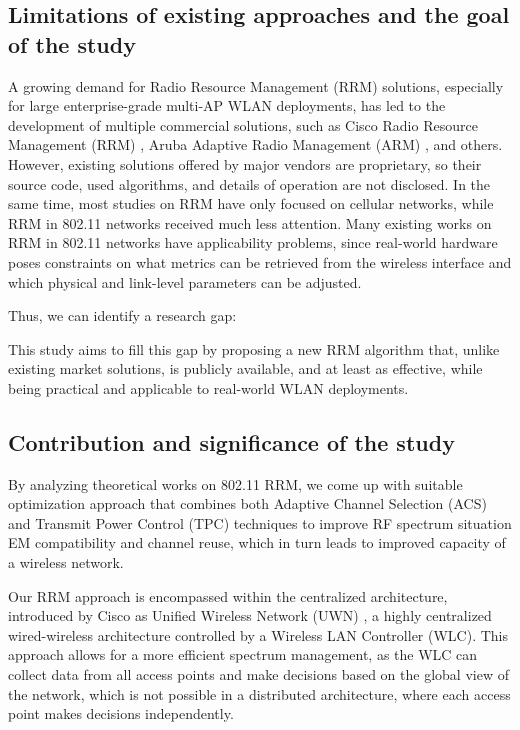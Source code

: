 \subsection{Limitations of existing approaches and the goal of the study}
A growing demand for Radio Resource Management (RRM) solutions, especially for large enterprise-grade multi-AP WLAN deployments, has led to the development of multiple commercial solutions, such as Cisco Radio Resource Management (RRM) \cite{ciscoRadioResourceManagement}, Aruba Adaptive Radio Management (ARM) \cite{UnderstandingARM}, and others. However, existing solutions offered by major vendors are proprietary, so their source code, used algorithms, and details of operation are not disclosed.
In the same time, most studies on RRM have only focused on cellular networks, while RRM in 802.11 networks received much less attention. Many existing works on RRM in 802.11 networks have applicability problems, since real-world hardware poses constraints on what metrics can be retrieved from the wireless interface and which physical and link-level parameters can be adjusted.

Thus, we can identify a research gap: 

This study aims to fill this gap by proposing a new RRM algorithm that, unlike existing market solutions, is publicly available, and at least as effective, while being practical and applicable to real-world WLAN deployments.

\subsection{Contribution and significance of the study}
By analyzing theoretical works on 802.11 RRM, we come up with suitable optimization approach that combines both Adaptive Channel Selection (ACS) and Transmit Power Control (TPC) techniques to improve RF spectrum situation EM compatibility and channel reuse, which in turn leads to improved capacity of a wireless network.

Our RRM approach is encompassed within the centralized architecture, introduced by Cisco as Unified Wireless Network (UWN) \cite{CiscoUnifiedWirelessa}, a highly centralized wired-wireless architecture controlled by a Wireless LAN Controller (WLC). This approach allows for a more efficient spectrum management, as the WLC can collect data from all access points and make decisions based on the global view of the network, which is not possible in a distributed architecture, where each access point makes decisions independently.


